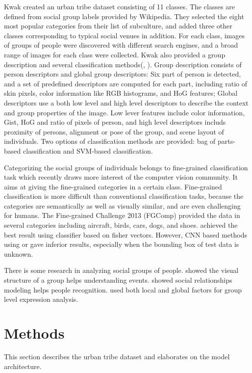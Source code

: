 \documentclass[10pt,twocolumn,letterpaper]{article}
\begin{document}
Kwak \etal created an urban tribe dataset consisting of 11 classes\cite{urbantribe2}. The classes are defined from social group labels provided by Wikipedia. They selected the eight most popular categories from their list of subculture, and added three other classes corresponding to typical social venues  in addition. For each class, images of groups of people were discovered with different search engines, and a broad range of images for each class were collected.  Kwak \etal also provided a group description and several classification methods(\cite{urbantribe}, \cite{urbantribe2}). Group description consists of person descriptors and global group descriptors: Six part of person is detected, and a set of predefined descriptors are computed for each part, including ratio of skin pixels, color information like RGB histograms, and HoG features; Global descriptors use a both low level and high level descriptors to describe the context and group properties of the image. Low lever features  include color information, Gist, HoG and ratio of pixels of person, and high level descriptors includs proximity of persons, alignment or pose of the group, and scene layout of individuals. Two options of classification methods are provided: bag of parts-based classification and SVM-based classification.

Categorizing the social groups of individuals belongs to fine-grained classification task which recently draws more interest of the computer vision community. It aims at giving the fine-grained categories in a certain class. Fine-grained classification is more difficult than conventional classification tasks, because the categories are semantically as well as visually similar, and are even challenging for humans. The Fine-grained Challenge 2013 (FGComp) provided the data in several categories including aircraft, birds, cars, dogs, and shoes. \cite{finegrain} achieved the best result using classifier based on fisher vectors. However, CNN based methods using \cite{caffe} or \cite{decaf} gave inferior results, especially when the bounding box of test data is unknown.

There is some research in analyzing social groups of people. \cite{groupstructure} showed the visual structure of a group helps understanding events. \cite{socialrelationship} showed social relationships modeling helps people recognition. \cite{happiest} used both local and global factors for group level expression analysis.


\section{Methods}
This section describes the urban tribe dataset and elaborates on the model architecture.
\end{document}
